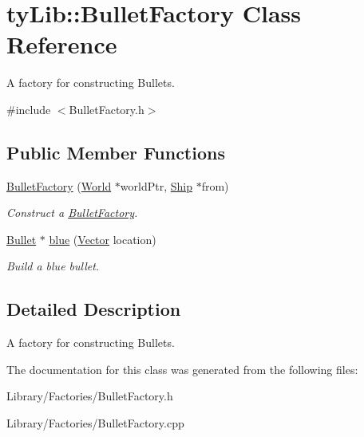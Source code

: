 \hypertarget{classty_lib_1_1_bullet_factory}{}\section{ty\+Lib\+:\+:Bullet\+Factory Class Reference}
\label{classty_lib_1_1_bullet_factory}


A factory for constructing Bullets.  




{\ttfamily \#include $<$Bullet\+Factory.\+h$>$}

\subsection*{Public Member Functions}
\begin{DoxyCompactItemize}
\item 
\hypertarget{classty_lib_1_1_bullet_factory_ae03b0569af924bc3721620c657a3582c}{}\hyperlink{classty_lib_1_1_bullet_factory_ae03b0569af924bc3721620c657a3582c}{Bullet\+Factory} (\hyperlink{classty_lib_1_1_world}{World} $\ast$world\+Ptr, \hyperlink{classty_lib_1_1_ship}{Ship} $\ast$from)\label{classty_lib_1_1_bullet_factory_ae03b0569af924bc3721620c657a3582c}

\begin{DoxyCompactList}\small\item\em Construct a \hyperlink{classty_lib_1_1_bullet_factory}{Bullet\+Factory}. \end{DoxyCompactList}\item 
\hypertarget{classty_lib_1_1_bullet_factory_a510a2d58a2f52390f2c8a061fca41fca}{}\hyperlink{classty_lib_1_1_bullet}{Bullet} $\ast$ \hyperlink{classty_lib_1_1_bullet_factory_a510a2d58a2f52390f2c8a061fca41fca}{blue} (\hyperlink{classty_lib_1_1_vector}{Vector} location)\label{classty_lib_1_1_bullet_factory_a510a2d58a2f52390f2c8a061fca41fca}

\begin{DoxyCompactList}\small\item\em Build a blue bullet. \end{DoxyCompactList}\end{DoxyCompactItemize}


\subsection{Detailed Description}
A factory for constructing Bullets. 

The documentation for this class was generated from the following files\+:\begin{DoxyCompactItemize}
\item 
Library/\+Factories/Bullet\+Factory.\+h\item 
Library/\+Factories/Bullet\+Factory.\+cpp\end{DoxyCompactItemize}
